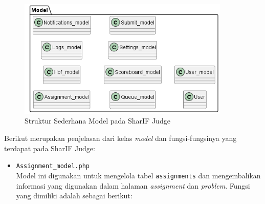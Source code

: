 \documentclass[a4paper,twoside]{article}
\begin{document}
\begin{enumerate}
\begin{itemize}
		            \begin{figure}[H]
			            \centering
			            \includegraphics[width=0.9\textwidth]{analisis/class/class_model.png}
			            \caption{Struktur Sederhana Model pada SharIF Judge}
			            \label{fig:3:1:model}
		            \end{figure}

		            Berikut merupakan penjelasan dari kelas \textit{model} dan fungsi-fungsinya yang terdapat pada SharIF Judge:

		            \begin{itemize}
			            \item \verb|Assignment_model.php| \\
			                  Model ini digunakan untuk mengelola tabel \verb|assignments| dan mengembalikan informasi yang digunakan dalam halaman \textit{assignment} dan \textit{problem}. Fungsi yang dimiliki adalah sebagai berikut:


\end{itemize}
\end{itemize}
\end{enumerate}
\end{document}
